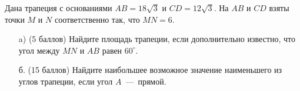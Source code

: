 
Дана трапеция с основаниями $AB = 18\sqrt{3}$ и $CD = 12\sqrt{3}$.
На $AB$ и $CD$ взяты точки $M$ и $N$
соответственно так, что $MN = 6$.

\begin{enumerate}
    \item[a)] (5 баллов) Найдите площадь трапеции, если дополнительно известно, что угол между $MN$
    и $AB$ равен $60^\circ$.
    \item[б.] (15 баллов) Найдите наибольшее возможное значение наименьшего из углов трапеции,
    если угол $A$~---~прямой.
    
    \end{enumerate}